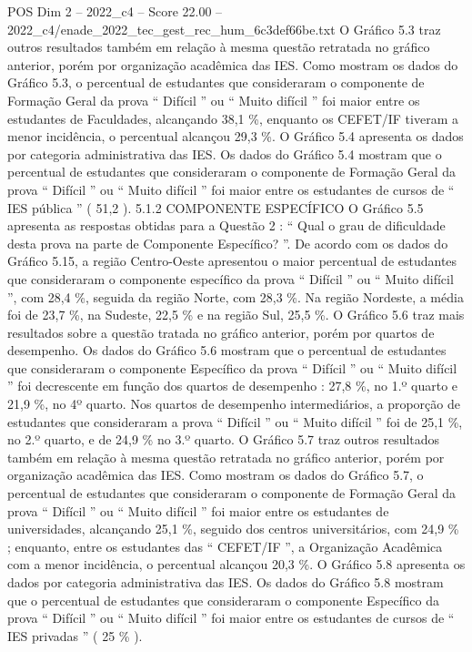 \begin{textsample}{POS Dim 2 – 2022\_c4 – Score 22.00 – 2022\_c4/enade\_2022\_tec\_gest\_rec\_hum\_6c3def66be.txt}
O Gráfico 5.3 traz outros resultados também em relação à mesma questão retratada no gráfico anterior, porém por organização acadêmica das IES.
Como mostram os dados do Gráfico 5.3, o percentual de estudantes que consideraram o componente de Formação Geral da prova “ Difícil ” ou “ Muito difícil ” foi maior entre os estudantes de Faculdades, alcançando 38,1 \%, enquanto os CEFET/IF tiveram a menor incidência, o percentual alcançou 29,3 \%.
O Gráfico 5.4 apresenta os dados por categoria administrativa das IES.
Os dados do Gráfico 5.4 mostram que o percentual de estudantes que consideraram o componente de Formação Geral da prova “ Difícil ” ou “ Muito difícil ” foi maior entre os estudantes de cursos de “ IES pública ” ( 51,2 ). 5.1.2 COMPONENTE ESPECÍFICO O Gráfico 5.5 apresenta as respostas obtidas para a Questão 2 : “ Qual o grau de dificuldade desta prova na parte de Componente Específico? ”.
De acordo com os dados do Gráfico 5.15, a região Centro-Oeste apresentou o maior percentual de estudantes que consideraram o componente específico da prova “ Difícil ” ou “ Muito difícil ”, com 28,4 \%, seguida da região Norte, com 28,3 \%.
Na região Nordeste, a média foi de 23,7 \%, na Sudeste, 22,5 \% e na região Sul, 25,5 \%.
O Gráfico 5.6 traz mais resultados sobre a questão tratada no gráfico anterior, porém por quartos de desempenho.
Os dados do Gráfico 5.6 mostram que o percentual de estudantes que consideraram o componente Específico da prova “ Difícil ” ou “ Muito difícil ” foi decrescente em função dos quartos de desempenho : 27,8 \%, no 1.º quarto e 21,9 \%, no 4º quarto.
Nos quartos de desempenho intermediários, a proporção de estudantes que consideraram a prova “ Difícil ” ou “ Muito difícil ” foi de 25,1 \%, no 2.º quarto, e de 24,9 \% no 3.º quarto.
O Gráfico 5.7 traz outros resultados também em relação à mesma questão retratada no gráfico anterior, porém por organização acadêmica das IES.
Como mostram os dados do Gráfico 5.7, o percentual de estudantes que consideraram o componente de Formação Geral da prova “ Difícil ” ou “ Muito difícil ” foi maior entre os estudantes de universidades, alcançando 25,1 \%, seguido dos centros universitários, com 24,9 \% ; enquanto, entre os estudantes das “ CEFET/IF ”, a Organização Acadêmica com a menor incidência, o percentual alcançou 20,3 \%.
O Gráfico 5.8 apresenta os dados por categoria administrativa das IES.
Os dados do Gráfico 5.8 mostram que o percentual de estudantes que consideraram o componente Específico da prova “ Difícil ” ou “ Muito difícil ” foi maior entre os estudantes de cursos de “ IES privadas ” ( 25 \% ).

\end{textsample}

